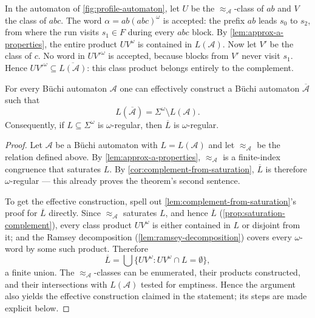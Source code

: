 \begin{example}
\label{ex:saturation-running}
In the automaton of \cref{fig:profile-automaton}, let $U$ be the
$\approx_{\mathcal A}$-class of $ab$ and $V$ the class of $abc$.  The word
$\alpha = ab(abc)^\omega$ is accepted: the prefix $ab$ leads $s_0$ to
$s_2$, from where the run visits $s_1\in F$ during every $abc$ block.  By \cref{lem:approx-a-properties}, the entire product
$UV^\omega$ is contained in $L(\mathcal A)$.  Now let $V'$ be the class of $c$.
No word in $UV'^\omega$ is accepted, because blocks from $V'$ never
visit $s_1$.  Hence $UV'^\omega\subseteq\overline{L(\mathcal A)}$: this class
product belongs entirely to the complement.
\end{example}

\begin{theorem}
\label{thm:buchi-complementation}
For every B\"uchi automaton $\mathcal A$ one can effectively construct a
B\"uchi automaton $\overline{\mathcal A}$ such that
\[
  L(\overline{\mathcal A})=\Sigma^\omega\setminus L(\mathcal A).
\]
Consequently, if $L\subseteq\Sigma^\omega$ is $\omega$-regular, then
$\overline{L}$ is $\omega$-regular.
\end{theorem}

\begin{proof}
Let $\mathcal A$ be a B\"uchi automaton with $L=L(\mathcal A)$ and let
$\approx_{\mathcal A}$ be the relation defined above.  By
\cref{lem:approx-a-properties}, $\approx_{\mathcal A}$ is a finite-index
congruence that saturates $L$.  By
\cref{cor:complement-from-saturation}, $\overline{L}$ is therefore
$\omega$-regular --- this already proves the theorem's second sentence.

To get the effective construction, spell out
\cref{lem:complement-from-saturation}'s proof for $\overline L$
directly.  Since $\approx_{\mathcal A}$ saturates $L$, and hence
$\overline L$ (\cref{prop:saturation-complement}), every class product
$UV^\omega$ is either contained in $L$ or disjoint from it; and the
Ramsey decomposition (\cref{lem:ramsey-decomposition}) covers every
$\omega$-word by some such product.  Therefore
\[
  \overline{L}
  =
  \bigcup\{UV^\omega : UV^\omega\cap L=\emptyset\},
\]
a finite union.  The $\approx_{\mathcal A}$-classes can be enumerated,
their products constructed, and their intersections with $L(\mathcal
A)$ tested for emptiness.  Hence the argument also yields the effective
construction claimed in the statement; its steps are made explicit
below.
\end{proof}

